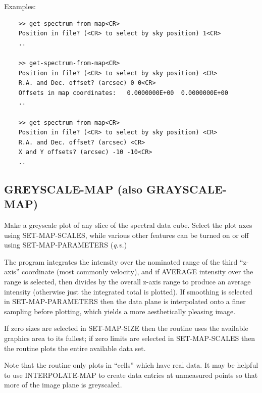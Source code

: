\documentclass[11pt,twoside]{report}
\begin{document}
Examples:
\begin{verbatim}
    >> get-spectrum-from-map<CR>
    Position in file? (<CR> to select by sky position) 1<CR>
    ..

    >> get-spectrum-from-map<CR>
    Position in file? (<CR> to select by sky position) <CR>
    R.A. and Dec. offset? (arcsec) 0 0<CR>
    Offsets in map coordinates:   0.0000000E+00  0.0000000E+00
    ..

    >> get-spectrum-from-map<CR>
    Position in file? (<CR> to select by sky position) <CR>
    R.A. and Dec. offset? (arcsec) <CR>
    X and Y offsets? (arcsec) -10 -10<CR>
    ..
\end{verbatim}

\subsection{GREYSCALE-MAP (also GRAYSCALE-MAP)}

Make a greyscale plot of any slice  of the spectral
data cube. Select the plot axes using SET-MAP-SCALES, while various other
features can be turned on or off using SET-MAP-PARAMETERS ({\it q.v.})

The program integrates the intensity over the nominated range of the third
``z-axis'' coordinate (most commonly velocity), and if AVERAGE intensity
over the range is selected, then divides by the overall z-axis range to
produce an average intensity (otherwise just the integrated total is plotted).
If smoothing is selected in SET-MAP-PARAMETERS then the data plane is
interpolated  onto a finer sampling before plotting,
which yields a more aesthetically pleasing image.

If zero sizes are selected in SET-MAP-SIZE then the routine uses the
available graphics area to its fullest; if zero limits are selected in
SET-MAP-SCALES then the routine plots the entire available data set.

Note that the routine only plots in ``cells'' which have real
data. It may be helpful to use INTERPOLATE-MAP to
create data entries at unmeasured points so that more of the image plane
is greyscaled.
\end{document}
